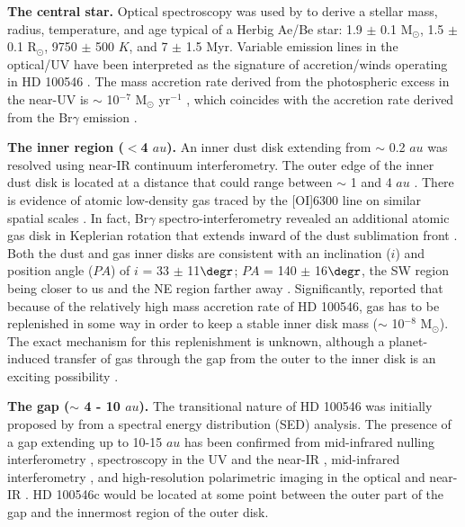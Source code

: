 \documentclass{aa}
\begin{document}
\textbf{\textup{The central star.}} Optical spectroscopy was used by \citet{Fairlamb15} to derive a stellar mass, radius, temperature, and age typical of a Herbig Ae/Be star: 1.9 $\pm$ 0.1 M$_{\odot}$, 1.5 $\pm$ 0.1 R$_{\odot}$, 9750 $\pm$ 500 $K$, and 7 $\pm$ 1.5 Myr. Variable emission lines in the optical/UV have been interpreted as the signature of accretion/winds operating in HD 100546 \citep{Vieira99,Deleuil04,guimaraes06}. The mass accretion rate derived from the photospheric excess in the near-UV is $\sim$ 10$^{-7}$ M$_{\odot}$ yr$^{-1}$ \citep{Fairlamb15}, which coincides with the accretion rate derived from the Br$\gamma$ emission \citep{Mendi15b}.

\textbf{The inner region ($<$4 $au$).} An inner dust disk extending from $\sim$ 0.2 $au$ was resolved using near-IR continuum interferometry. The outer edge of the inner dust disk is located at a distance that could range between $\sim$ 1 \citep{Mulders13,Panic14} and 4 $au$ \citep{Benisty10,Tatulli11}. There is evidence of atomic low-density gas traced by the [OI]6300 line on similar spatial scales \citep{Acke06}. In fact, Br$\gamma$ spectro-interferometry revealed an additional atomic gas disk in Keplerian rotation that extends inward of the dust sublimation front \citep{Mendi15b}. Both the dust and gas inner disks are consistent with an inclination ($i$) and position angle ($PA$) of $i$ = 33 $\pm$ 11$\degr$; $PA$ = 140 $\pm$ 16$\degr$, the SW region being closer to us and the NE region farther away \citep{Tatulli11,Mendi15b}. Significantly, \citet{Mendi15b} reported that because of the relatively high mass accretion rate of HD 100546, gas has to be replenished in some way in order to keep a stable inner disk mass ($\sim$ 10$^{-8}$ M$_\odot$). The exact mechanism for this replenishment is unknown, although a planet-induced transfer of gas through the gap from the outer to the inner disk is an exciting possibility \citep[see also][]{Rosenfeld14}. 

\textbf{The gap ($\sim$ 4 - 10 $au$).} The transitional nature of HD 100546 was initially proposed by \citet{Bouwman03} from a spectral energy distribution (SED) analysis. The presence of a gap extending up to 10-15 $au$ has been confirmed from mid-infrared nulling interferometry \citep{Liu03}, spectroscopy in the UV and the near-IR \citep{Grady05,Brittain09,vanderplas09}, mid-infrared interferometry \citep{Panic14}, and high-resolution polarimetric imaging in the optical and near-IR \citep{Quanz11,Garufi16,Follette17}. HD 100546c would be located at some point between the outer part of the gap and the innermost region of the outer disk.  
\end{document}
